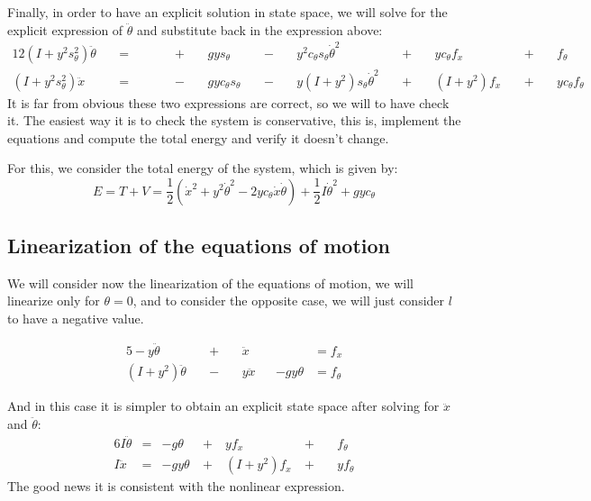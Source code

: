 Finally, in order to have an explicit solution in state space, we will solve for the explicit expression of $\ddot{\theta}$ and substitute back in the expression above:
\begin{alignat}{12}
	(I+y^2 s_\theta^2) \ddot{\theta}  && \ = \ &&  && \ + \ &&g y s_\theta  && \ - \ && y^2  c_\theta s_\theta \dot{\theta}^2  && \ + \ &&  y c_\theta f_x && \ + \ && f_\theta&&  \\
	(I+y^2 s_\theta^2) \ddot{x}       && \ = \ &&  && \ - \ && gy c_\theta s_\theta && \ - \ &&y (I+y^2) s_\theta \dot{\theta}^2      && \ + \ && (I+y^2) f_x     && \ + \ && y c_\theta f_\theta&&
\end{alignat}
It is far from obvious these two expressions are correct, so we will to have check it. The easiest way it is to check the system is conservative, this is, implement the equations and compute the total energy and verify it doesn't change.

For this, we consider the total energy of the system, which is given by:
\begin{equation}
	E = T + V = \frac{1}{2} \left(\dot{x}^2 + y^2 \dot{\theta}^2 - 2 y c_\theta  \dot{x} \dot{\theta} \right) + \frac{1}{2}I\dot{\theta}^2 + g y c_\theta
\end{equation}

\subsection{Linearization of the equations of motion}
We will consider now the linearization of the equations of motion, we will linearize only for $\theta=0$, and to consider the opposite case, we will just consider $l$ to have a negative value.

\begin{alignat}{5}
	-y \ddot{\theta} && \ + \ && \ddot{x} && \ &= f_x \\
	\left(I+y^2\right) \ddot{\theta} && \ - \ && y \ddot{x} &&- g y \theta &= f_\theta
\end{alignat}

And in this case it is simpler to obtain an explicit state space after solving for $\ddot{x}$ and $\ddot{\theta}$:
\begin{alignat}{6}
	I \ddot{\theta} &=& -g \theta & \ + \ & y f_x & \ + \ &&f_\theta \\
	I \ddot{x}      &=& -g y\theta & \ + \ & (I+y^2) f_x & \ + \ && y f_\theta
\end{alignat}
The good news it is consistent with the nonlinear expression.